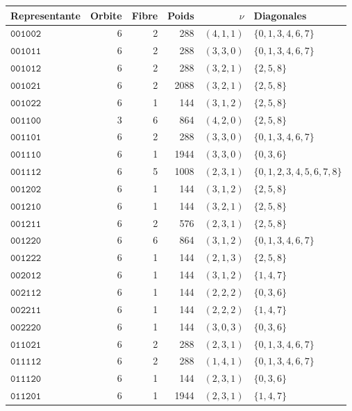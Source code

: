 \begin{longtable}{@{}lrrrrl@{}}
\toprule Representante&Orbite&Fibre&Poids&\(\nu\)&Diagonales\\\midrule\endhead
\(\mathtt{001002}\)&6&2&288&\((4,1,1)\)&\(\{0,1,3,4,6,7\}\)\\
\(\mathtt{001011}\)&6&2&288&\((3,3,0)\)&\(\{0,1,3,4,6,7\}\)\\
\(\mathtt{001012}\)&6&2&288&\((3,2,1)\)&\(\{2,5,8\}\)\\
\(\mathtt{001021}\)&6&2&2088&\((3,2,1)\)&\(\{2,5,8\}\)\\
\(\mathtt{001022}\)&6&1&144&\((3,1,2)\)&\(\{2,5,8\}\)\\
\(\mathtt{001100}\)&3&6&864&\((4,2,0)\)&\(\{2,5,8\}\)\\
\(\mathtt{001101}\)&6&2&288&\((3,3,0)\)&\(\{0,1,3,4,6,7\}\)\\
\(\mathtt{001110}\)&6&1&1944&\((3,3,0)\)&\(\{0,3,6\}\)\\
\(\mathtt{001112}\)&6&5&1008&\((2,3,1)\)&\(\{0,1,2,3,4,5,6,7,8\}\)\\
\(\mathtt{001202}\)&6&1&144&\((3,1,2)\)&\(\{2,5,8\}\)\\
\(\mathtt{001210}\)&6&1&144&\((3,2,1)\)&\(\{2,5,8\}\)\\
\(\mathtt{001211}\)&6&2&576&\((2,3,1)\)&\(\{2,5,8\}\)\\
\(\mathtt{001220}\)&6&6&864&\((3,1,2)\)&\(\{0,1,3,4,6,7\}\)\\
\(\mathtt{001222}\)&6&1&144&\((2,1,3)\)&\(\{2,5,8\}\)\\
\(\mathtt{002012}\)&6&1&144&\((3,1,2)\)&\(\{1,4,7\}\)\\
\(\mathtt{002112}\)&6&1&144&\((2,2,2)\)&\(\{0,3,6\}\)\\
\(\mathtt{002211}\)&6&1&144&\((2,2,2)\)&\(\{1,4,7\}\)\\
\(\mathtt{002220}\)&6&1&144&\((3,0,3)\)&\(\{0,3,6\}\)\\
\(\mathtt{011021}\)&6&2&288&\((2,3,1)\)&\(\{0,1,3,4,6,7\}\)\\
\(\mathtt{011112}\)&6&2&288&\((1,4,1)\)&\(\{0,1,3,4,6,7\}\)\\
\(\mathtt{011120}\)&6&1&144&\((2,3,1)\)&\(\{0,3,6\}\)\\
\(\mathtt{011201}\)&6&1&1944&\((2,3,1)\)&\(\{1,4,7\}\)\\

\end{longtable}
